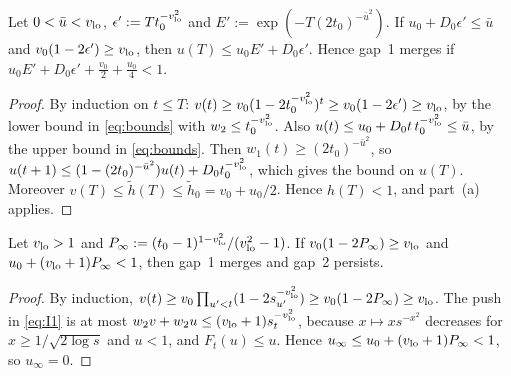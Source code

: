 \begin{lemma}\label{lem:winR}
Let $0<\bar u<v_{\rm lo}$, $\epsilon':=Tt_0^{-v_{\rm lo}^2}$ and $E':=\exp(-T(2t_0)^{-\bar u^2})$. If $u_0+D_0\epsilon'\le\bar u$ and
$v_0(1-2\epsilon')\ge v_{\rm lo}$, then $u(T)\le u_0E'+D_0\epsilon'$. Hence gap~1 merges if $u_0E'+D_0\epsilon'+\frac{v_0}2+\frac{u_0}4<1$.
\end{lemma}
\begin{proof}
By induction on $t\le T$: $v(t)\ge v_0(1-2t_0^{-v_{\rm lo}^2})^t\ge v_0(1-2\epsilon')\ge v_{\rm lo}$, by the lower bound in \eqref{eq:bounds} with
$w_2\le t_0^{-v_{\rm lo}^2}$. Also $u(t)\le u_0+D_0t\,t_0^{-v_{\rm lo}^2}\le\bar u$, by the upper bound in \eqref{eq:bounds}. Then
$w_1(t)\ge(2t_0)^{-\bar u^2}$, so $u(t+1)\le(1-(2t_0)^{-\bar u^2})u(t)+D_0t_0^{-v_{\rm lo}^2}$, which gives the bound on $u(T)$. Moreover
$v(T)\le\tilde h(T)\le\tilde h_0=v_0+u_0/2$. Hence $h(T)<1$, and part~(a) applies.
\end{proof}

\begin{lemma}\label{lem:winV}
Let $v_{\rm lo}>1$ and $P_\infty:=(t_0-1)^{1-v_{\rm lo}^2}/(v_{\rm lo}^2-1)$. If $v_0(1-2P_\infty)\ge v_{\rm lo}$ and
$u_0+(v_{\rm lo}+1)P_\infty<1$, then gap~1 merges and gap~2 persists.
\end{lemma}
\begin{proof}
By induction, $v(t)\ge v_0\prod_{u'<t}(1-2s_{u'}^{-v_{\rm lo}^2})\ge v_0(1-2P_\infty)\ge v_{\rm lo}$. The push in \eqref{eq:I1} is at most
$w_2v+w_2u\le(v_{\rm lo}+1)s_t^{-v_{\rm lo}^2}$, because $x\mapsto xs^{-x^2}$ decreases for $x\ge1/\sqrt{2\log s}$ and $u<1$, and
$F_t(u)\le u$. Hence $u_\infty\le u_0+(v_{\rm lo}+1)P_\infty<1$, so $u_\infty=0$.
\end{proof}

